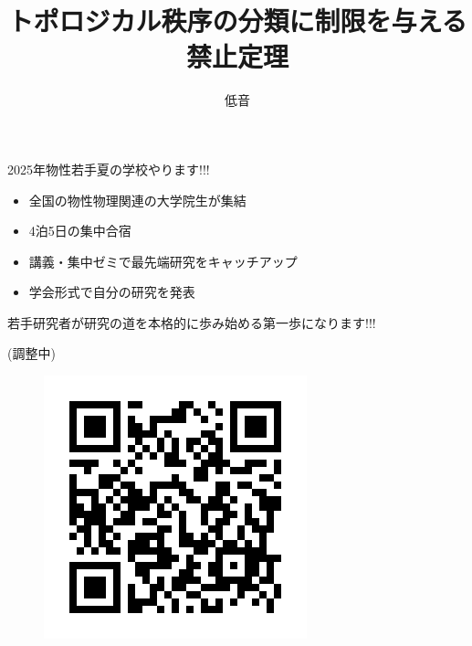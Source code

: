 \documentclass[dvipdfm]{beamer}
\title{トポロジカル秩序の分類に制限を与える禁止定理}
\author{低音}
\begin{document}
\begin{frame}
    \titlepage
\end{frame}

\begin{frame}{2025年物性若手夏の学校やります!!!}
    \begin{itemize}
        \item 全国の物性物理関連の大学院生が集結
        \item 4泊5日の集中合宿
        \item 講義・集中ゼミで最先端研究をキャッチアップ
        \item 学会形式で自分の研究を発表
    \end{itemize}
    若手研究者が研究の道を本格的に歩み始める第一歩になります!!!

    \textbf{}

    \textbf{}(調整中)
    \begin{figure}
        \centering
        \includegraphics[width=0.2\linewidth]{QR_736654.png}
    \end{figure}
\end{frame}
\end{document}
